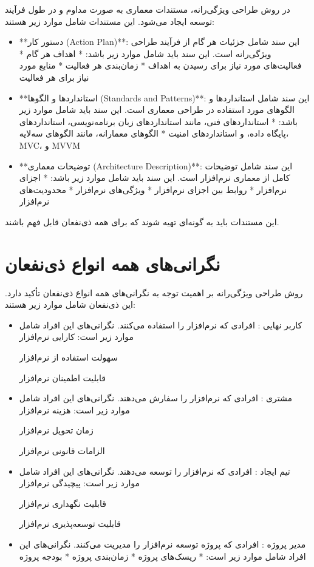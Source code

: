 در روش طراحی ویژگی‌رانه، مستندات معماری به صورت مداوم و در طول فرآیند توسعه ایجاد می‌شود. این مستندات شامل موارد زیر هستند:

\begin{itemize}
	\item **دستور کار (Action Plan)**: این سند شامل جزئیات هر گام از فرآیند طراحی ویژگی‌رانه است. این سند باید شامل موارد زیر باشد:
	* اهداف هر گام
	* فعالیت‌های مورد نیاز برای رسیدن به اهداف
	* زمان‌بندی هر فعالیت
	* منابع مورد نیاز برای هر فعالیت
	\item **استانداردها و الگوها (Standards and Patterns)**: این سند شامل استانداردها و الگوهای مورد استفاده در طراحی معماری است. این سند باید شامل موارد زیر باشد:
	* استانداردهای فنی، مانند استانداردهای زبان برنامه‌نویسی، استانداردهای پایگاه داده، و استانداردهای امنیت
	* الگوهای معمارانه، مانند الگوهای سه‌لایه، MVC، و MVVM
	\item **توضیحات معماری (Architecture Description)**: این سند شامل توضیحات کامل از معماری نرم‌افزار است. این سند باید شامل موارد زیر باشد:
	* اجزای نرم‌افزار
	* روابط بین اجزای نرم‌افزار
	* ویژگی‌های نرم‌افزار
	* محدودیت‌های نرم‌افزار
\end{itemize}

این مستندات باید به گونه‌ای تهیه شوند که برای همه ذی‌نفعان قابل فهم باشند.

\section{نگرانی‌های همه انواع ذی‌نفعان}

روش طراحی ویژگی‌رانه بر اهمیت توجه به نگرانی‌های همه انواع ذی‌نفعان تأکید دارد. این ذی‌نفعان شامل موارد زیر هستند:

\begin{itemize}
	\item کاربر نهایی  : افرادی که نرم‌افزار را استفاده می‌کنند. نگرانی‌های این افراد شامل موارد زیر است:
	کارایی نرم‌افزار
	
	سهولت استفاده از نرم‌افزار
	
	قابلیت اطمینان نرم‌افزار
	
	\item مشتری  : افرادی که نرم‌افزار را سفارش می‌دهند. نگرانی‌های این افراد شامل موارد زیر است:
	هزینه نرم‌افزار
	
	زمان تحویل نرم‌افزار
	
	الزامات قانونی نرم‌افزار
	
	\item تیم ایجاد  : افرادی که نرم‌افزار را توسعه می‌دهند. نگرانی‌های این افراد شامل موارد زیر است:
	پیچیدگی نرم‌افزار
	
	قابلیت نگهداری نرم‌افزار
	
	قابلیت توسعه‌پذیری نرم‌افزار
	
	\item مدیر پروژه  : افرادی که پروژه توسعه نرم‌افزار را مدیریت می‌کنند. نگرانی‌های این افراد شامل موارد زیر است:
	* ریسک‌های پروژه
	* زمان‌بندی پروژه
	* بودجه پروژه
\end{itemize}


